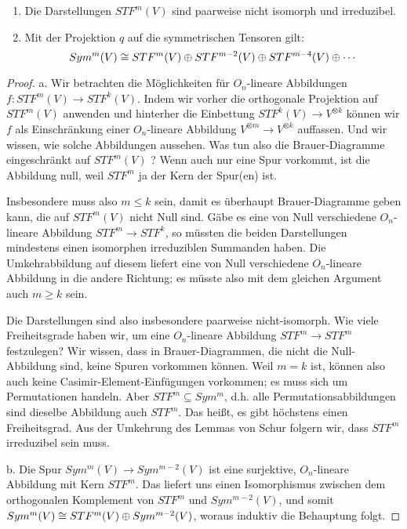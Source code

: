 \begin{theorem}
\begin{enumerate}
\item Die Darstellungen $STF^m(V)$ sind paarweise nicht isomorph und irreduzibel.
\item Mit der Projektion $q$ auf die symmetrischen Tensoren gilt:
\[Sym^m(V) \cong STF^m(V) \oplus STF^{m-2}(V) \oplus STF^{m-4}(V) \oplus \cdots\]
\end{enumerate}
\end{theorem}
\begin{proof}
a. Wir betrachten die Möglichkeiten für $O_n$-lineare Abbildungen $f: STF^m(V) \to STF^k(V)$. Indem wir vorher die orthogonale Projektion auf $STF^m(V)$ anwenden und hinterher die Einbettung $STF^k(V) \to V^{\otimes k}$ können wir $f$ als Einschränkung einer $O_n$-lineare Abbildung $V^{\otimes m} \to V^{\otimes k}$ auffassen. Und wir wissen, wie solche Abbildungen aussehen. Was tun also die Brauer-Diagramme eingeschränkt auf $STF^m(V)$ ? Wenn auch nur eine Spur vorkommt, ist die Abbildung null, weil $STF^m$ ja der Kern der Spur(en) ist.

Insbesondere muss also $m\leq k$ sein, damit es überhaupt Brauer-Diagramme geben kann, die auf $STF^m(V)$ nicht Null sind. Gäbe es eine von Null verschiedene $O_n$-lineare Abbildung $STF^m\to STF^k$, so müssten die beiden Darstellungen mindestens einen isomorphen irreduziblen Summanden haben. Die Umkehrabbildung auf diesem liefert eine von Null verschiedene $O_n$-lineare Abbildung in die andere Richtung; es müsste also mit dem gleichen Argument auch $m\geq k$ sein.

Die Darstellungen sind also insbesondere paarweise nicht-isomorph. Wie viele Freiheitsgrade haben wir, um eine $O_n$-lineare Abbildung $STF^m\to STF^m$ festzulegen? Wir wissen, dass in Brauer-Diagrammen, die nicht die Null-Abbildung sind, keine Spuren vorkommen können. Weil $m=k$ ist, können also auch keine Casimir-Element-Einfügungen vorkommen; es muss sich um Permutationen handeln. Aber $STF^m \subseteq Sym^m$, d.h. alle Permutationsabbildungen sind dieselbe Abbildung auch $STF^m$. Das heißt, es gibt höchstens einen Freiheitsgrad. Aus der Umkehrung des Lemmas von Schur folgern wir, dass $STF^m$ irreduzibel sein muss.

\medbreak
b. Die Spur $Sym^m(V) \to Sym^{m-2}(V)$ ist eine surjektive, $O_n$-lineare Abbildung mit Kern $STF^m$. Das liefert uns einen Isomorphismus zwischen dem orthogonalen Komplement von $STF^m$ und $Sym^{m-2}(V)$, und somit $Sym^m(V) \cong STF^m(V) \oplus Sym^{m-2}(V)$, woraus induktiv die Behauptung folgt.
\end{proof}